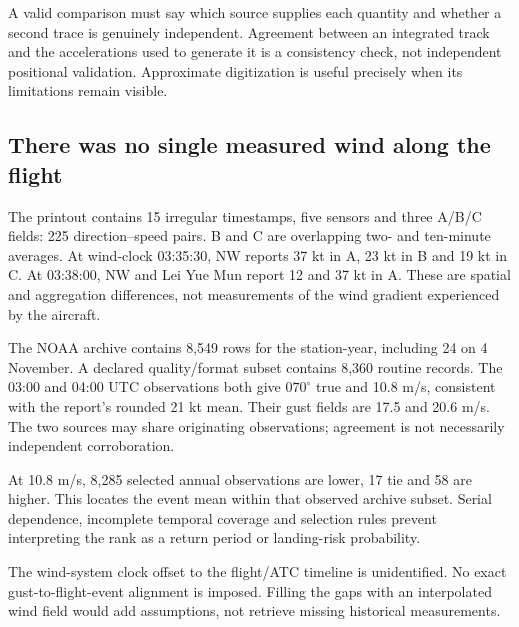 A valid comparison must say which source supplies each quantity and whether a second trace is genuinely independent. Agreement between an integrated track and the accelerations used to generate it is a consistency check, not independent positional validation. Approximate digitization is useful precisely when its limitations remain visible.
\par\medskip
\subsection*{There was no single measured wind along the flight}

The printout contains 15 irregular timestamps, five sensors and three A/B/C fields: 225 direction--speed pairs. B and C are overlapping two- and ten-minute averages. At wind-clock 03:35:30, NW reports 37 kt in A, 23 kt in B and 19 kt in C. At 03:38:00, NW and Lei Yue Mun report 12 and 37 kt in A. These are spatial and aggregation differences, not measurements of the wind gradient experienced by the aircraft.

The NOAA archive contains 8,549 rows for the station-year, including 24 on 4 November. A declared quality/format subset contains 8,360 routine records. The 03:00 and 04:00 UTC observations both give $070^\circ$ true and 10.8 m/s, consistent with the report's rounded 21 kt mean. Their gust fields are 17.5 and 20.6 m/s. The two sources may share originating observations; agreement is not necessarily independent corroboration.

At 10.8 m/s, 8,285 selected annual observations are lower, 17 tie and 58 are higher. This locates the event mean within that observed archive subset. Serial dependence, incomplete temporal coverage and selection rules prevent interpreting the rank as a return period or landing-risk probability.

The wind-system clock offset to the flight/ATC timeline is unidentified. No exact gust-to-flight-event alignment is imposed. Filling the gaps with an interpolated wind field would add assumptions, not retrieve missing historical measurements.
\par\medskip
